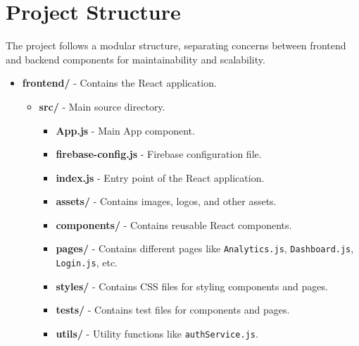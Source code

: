 \documentclass[a4paper,12pt]{article}
\begin{document}
\section{Project Structure}



The project follows a modular structure, separating concerns between frontend and backend components for maintainability and scalability.



\begin{itemize}

    \item \textbf{frontend/} - Contains the React application.

    \begin{itemize}

        \item \textbf{src/} - Main source directory.

        \begin{itemize}

            \item \textbf{App.js} - Main App component.

            \item \textbf{firebase-config.js} - Firebase configuration file.

            \item \textbf{index.js} - Entry point of the React application.

            \item \textbf{assets/} - Contains images, logos, and other assets.

            \item \textbf{components/} - Contains reusable React components.

            \item \textbf{pages/} - Contains different pages like \texttt{Analytics.js}, \texttt{Dashboard.js}, \texttt{Login.js}, etc.

            \item \textbf{styles/} - Contains CSS files for styling components and pages.

            \item \textbf{tests/} - Contains test files for components and pages.

            \item \textbf{utils/} - Utility functions like \texttt{authService.js}.

        \end{itemize}


\end{itemize}
\end{itemize}
\end{document}
